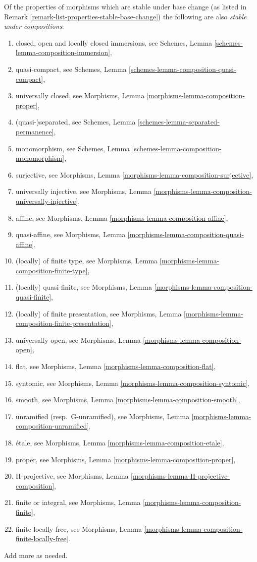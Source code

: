 \begin{remark}
\label{remark-list-properties-stable-composition}
Of the properties of morphisms which are stable under base change
(as listed in
Remark \ref{remark-list-properties-stable-base-change})
the following are also {\it stable under compositions}:
\begin{enumerate}
\item closed, open and locally closed immersions, see
Schemes, Lemma \ref{schemes-lemma-composition-immersion},
\item quasi-compact, see
Schemes, Lemma \ref{schemes-lemma-composition-quasi-compact},
\item universally closed, see
Morphisms, Lemma \ref{morphisms-lemma-composition-proper},
\item (quasi-)separated, see
Schemes, Lemma \ref{schemes-lemma-separated-permanence},
\item monomorphism, see
Schemes, Lemma \ref{schemes-lemma-composition-monomorphism},
\item surjective, see
Morphisms, Lemma \ref{morphisms-lemma-composition-surjective},
\item universally injective, see
Morphisms, Lemma \ref{morphisms-lemma-composition-universally-injective},
\item affine, see
Morphisms, Lemma \ref{morphisms-lemma-composition-affine},
\item quasi-affine, see
Morphisms, Lemma \ref{morphisms-lemma-composition-quasi-affine},
\item (locally) of finite type, see
Morphisms, Lemma \ref{morphisms-lemma-composition-finite-type},
\item (locally) quasi-finite, see
Morphisms, Lemma \ref{morphisms-lemma-composition-quasi-finite},
\item (locally) of finite presentation, see
Morphisms, Lemma \ref{morphisms-lemma-composition-finite-presentation},
\item universally open, see
Morphisms, Lemma \ref{morphisms-lemma-composition-open},
\item flat, see
Morphisms, Lemma \ref{morphisms-lemma-composition-flat},
\item syntomic, see
Morphisms, Lemma \ref{morphisms-lemma-composition-syntomic},
\item smooth, see
Morphisms, Lemma \ref{morphisms-lemma-composition-smooth},
\item unramified (resp.\ G-unramified), see
Morphisms, Lemma \ref{morphisms-lemma-composition-unramified},
\item \'etale, see
Morphisms, Lemma \ref{morphisms-lemma-composition-etale},
\item proper, see
Morphisms, Lemma \ref{morphisms-lemma-composition-proper},
\item H-projective, see
Morphisms, Lemma \ref{morphisms-lemma-H-projective-composition},
\item finite or integral, see
Morphisms, Lemma \ref{morphisms-lemma-composition-finite},
\item finite locally free, see
Morphisms, Lemma \ref{morphisms-lemma-composition-finite-locally-free}.
\end{enumerate}
Add more as needed.
\end{remark}

